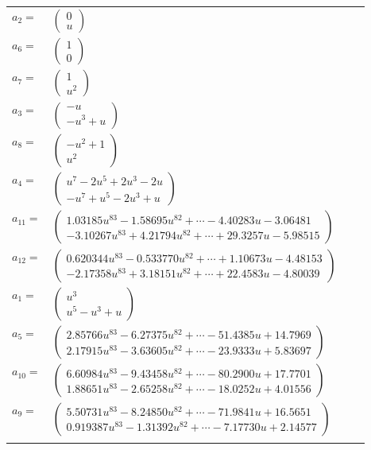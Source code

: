 \documentclass[1p]{elsarticle_modified}
\theoremstyle{definition}
\begin{document}
\begin{tabular}{m{7pt} m{180pt} m{7pt} m{180pt} }
\flushright $a_{2}=$&$\begin{pmatrix}0\\u\end{pmatrix}$ \\
\flushright $a_{6}=$&$\begin{pmatrix}1\\0\end{pmatrix}$ \\
\flushright $a_{7}=$&$\begin{pmatrix}1\\u^2\end{pmatrix}$ \\
\flushright $a_{3}=$&$\begin{pmatrix}- u\\- u^3+u\end{pmatrix}$ \\
\flushright $a_{8}=$&$\begin{pmatrix}- u^2+1\\u^2\end{pmatrix}$ \\
\flushright $a_{4}=$&$\begin{pmatrix}u^7-2 u^5+2 u^3-2 u\\- u^7+u^5-2 u^3+u\end{pmatrix}$ \\
\flushright $a_{11}=$&$\begin{pmatrix}1.03185 u^{83}-1.58695 u^{82}+\cdots-4.40283 u-3.06481\\-3.10267 u^{83}+4.21794 u^{82}+\cdots+29.3257 u-5.98515\end{pmatrix}$ \\
\flushright $a_{12}=$&$\begin{pmatrix}0.620344 u^{83}-0.533770 u^{82}+\cdots+1.10673 u-4.48153\\-2.17358 u^{83}+3.18151 u^{82}+\cdots+22.4583 u-4.80039\end{pmatrix}$ \\
\flushright $a_{1}=$&$\begin{pmatrix}u^3\\u^5- u^3+u\end{pmatrix}$ \\
\flushright $a_{5}=$&$\begin{pmatrix}2.85766 u^{83}-6.27375 u^{82}+\cdots-51.4385 u+14.7969\\2.17915 u^{83}-3.63605 u^{82}+\cdots-23.9333 u+5.83697\end{pmatrix}$ \\
\flushright $a_{10}=$&$\begin{pmatrix}6.60984 u^{83}-9.43458 u^{82}+\cdots-80.2900 u+17.7701\\1.88651 u^{83}-2.65258 u^{82}+\cdots-18.0252 u+4.01556\end{pmatrix}$ \\
\flushright $a_{9}=$&$\begin{pmatrix}5.50731 u^{83}-8.24850 u^{82}+\cdots-71.9841 u+16.5651\\0.919387 u^{83}-1.31392 u^{82}+\cdots-7.17730 u+2.14577\end{pmatrix}$\\&\end{tabular}
\end{document}
